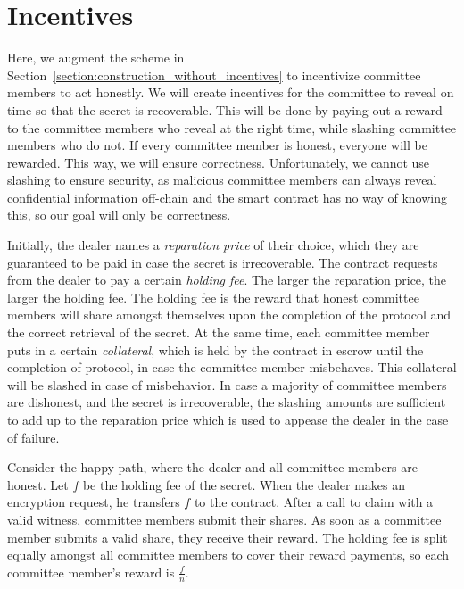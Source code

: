 \section{Incentives}\label{section:construction_incentives}
Here, we augment the scheme in Section~\ref{section:construction_without_incentives} to incentivize committee members to act honestly.
We will create incentives for the committee to reveal on time so that the secret is recoverable.
This will be done by paying out a reward to the committee members who reveal at the right time, while slashing committee members who do not.
If every committee member is honest, everyone will be rewarded.
This way, we will ensure correctness.
Unfortunately, we cannot use slashing to ensure security, as malicious committee members can always reveal confidential information off-chain and the smart contract has no way of knowing this, so our goal will only be correctness.

Initially, the dealer names a \emph{reparation price} of their choice, which they are guaranteed to be paid in case the secret is irrecoverable.
The contract requests from the dealer to pay a certain \emph{holding fee}.
The larger the reparation price, the larger the holding fee. 
The holding fee is the reward that honest committee members will share amongst themselves upon the completion of the protocol and the correct retrieval of the secret.
At the same time, each committee member puts in a certain \emph{collateral}, which is held by the contract in escrow until the completion of protocol, in case the committee member misbehaves.
This collateral will be slashed in case of misbehavior.
In case a majority of committee members are dishonest, and the secret is irrecoverable, the slashing amounts are sufficient to add up to the reparation price which is used to appease the dealer in the case of failure.

Consider the happy path, where the dealer and all committee members are honest.
Let $f$ be the holding fee of the secret.
When the dealer makes an encryption request, he transfers $f$ to the contract.
After a call to \textsf{claim} with a valid witness, committee members submit their shares.
As soon as a committee member submits a valid share, they receive their reward.
The holding fee is split equally amongst all committee members to cover their reward payments, so each committee member's reward is $\frac{f}{n}$.

